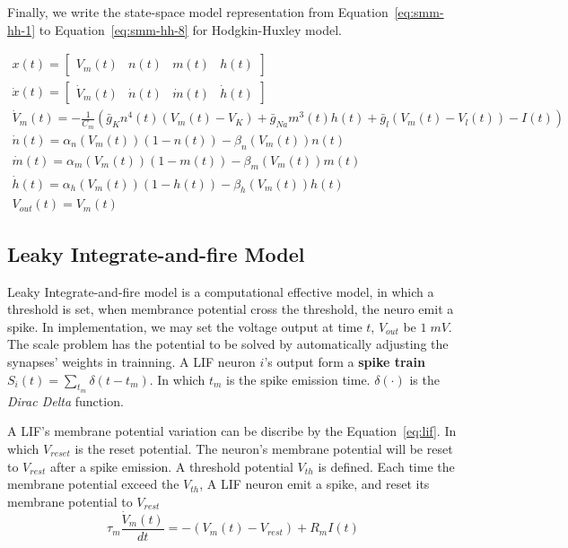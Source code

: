 Finally, we write the state-space model representation from Equation~\ref{eq:smm-hh-1} to 
Equation~\ref{eq:smm-hh-8} for Hodgkin-Huxley model.

\begin{align}
    x(t) = \begin{bmatrix}V_m(t) & n(t) & m(t) & h(t)\end{bmatrix} \label{eq:smm-hh-1}\\
    \dot x(t) = \begin{bmatrix}\dot V_m(t) & \dot n(t) & \dot m(t) & \dot h(t)\end{bmatrix}\label{eq:smm-hh-2} \\
    \dot V_m(t) = -\frac{1}{C_m}(\bar g_Kn^4(t)(V_m(t)-V_K)+\bar g_{Na}m^3(t)h(t)+\bar g_l(V_m(t)-V_l(t)) - I(t)) \label{eq:smm-hh-4}\\
    \dot n(t)= \alpha_n(V_m(t))(1-n(t))-\beta_n(V_m(t))n(t) \label{eq:smm-hh-5}\\
    \dot m(t)= \alpha_m(V_m(t))(1-m(t))-\beta_m(V_m(t))m(t) \label{eq:smm-hh-6}\\
    \dot h(t)= \alpha_h(V_m(t))(1-h(t))-\beta_h(V_m(t))h(t) \label{eq:smm-hh-7}\\
    V_{out}(t) = V_m(t) \label{eq:smm-hh-8}
\end{align}


\subsection{Leaky Integrate-and-fire Model}
\label{sec:current-based-lif}
Leaky Integrate-and-fire model is a computational effective model, 
in which a threshold is set, when membrance potential cross the threshold, 
the neuro emit a spike. 
In implementation, we may set the voltage output at time $t$, $V_{out}$ be $1\;mV$. 
The scale problem has the potential to be solved by automatically adjusting the synapses' weights 
in trainning.
A LIF neuron $i$'s output form a \textbf{spike train} $S_{i}(t) = \sum_{t_m}\delta(t-t_m)$.
In which $t_m$ is the spike emission time. $\delta(\cdot)$ is the \textit{Dirac Delta} function.

A LIF's membrane potential variation can be discribe by the Equation~\ref{eq:lif}.
In which $V_{reset}$ is the reset potential. The neuron's membrane potential will be reset to $V_{rest}$
after a spike emission.
A threshold potential $V_{th}$ is defined. Each time the membrane potential exceed the $V_{th}$, A
LIF neuron emit a spike, and reset its membrane potential to $V_{rest}$
\begin{equation}\label{eq:lif}
    \tau_m\frac{\dot V_m(t)}{dt} = -(V_m(t)-V_{rest}) + R_mI(t)
\end{equation}


